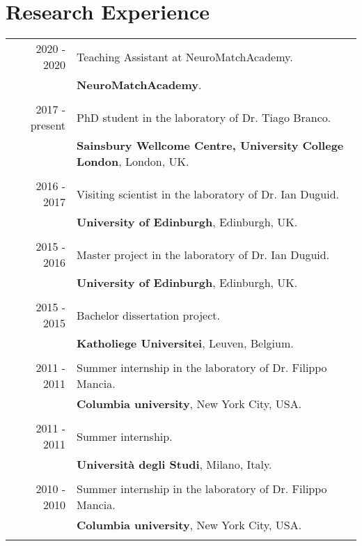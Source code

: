 \documentclass[a4paper,10pt]{article}
\begin{document}
\section{Research Experience}
\begin{tabular}{r|p{11cm}}

    2020 - 2020 & Teaching Assistant at NeuroMatchAcademy.  \\&
    \normalsize\textbf{NeuroMatchAcademy}.
    \\\multicolumn{2}{c}{} \\

    2017 - present & PhD student in the laboratory of Dr. Tiago Branco.  \\&
    \normalsize\textbf{Sainsbury Wellcome Centre, University College London}, London, UK.
    \\\multicolumn{2}{c}{} \\
 
    2016 - 2017 & Visiting scientist in the laboratory of Dr. Ian Duguid.  \\&
    \normalsize\textbf{University of Edinburgh}, Edinburgh, UK.
    \\\multicolumn{2}{c}{} \\
 
    2015 - 2016 & Master project in the laboratory of Dr. Ian Duguid.  \\&
    \normalsize\textbf{University of Edinburgh}, Edinburgh, UK.
    \\\multicolumn{2}{c}{} \\
 
    2015 - 2015 & Bachelor dissertation project.  \\&
    \normalsize\textbf{Katholiege Universitei}, Leuven, Belgium.
    \\\multicolumn{2}{c}{} \\
 
    2011 - 2011 & Summer internship in the laboratory of Dr. Filippo Mancia.  \\&
    \normalsize\textbf{Columbia university}, New York City, USA.
    \\\multicolumn{2}{c}{} \\
 
    2011 - 2011 & Summer internship.  \\&
    \normalsize\textbf{Università degli Studi}, Milano, Italy.
    \\\multicolumn{2}{c}{} \\
    
    2010 - 2010 & Summer internship in the laboratory of Dr. Filippo Mancia.  \\&
    \normalsize\textbf{Columbia university}, New York City, USA.
    \\\multicolumn{2}{c}{} \\
\end{tabular}
\end{document}
